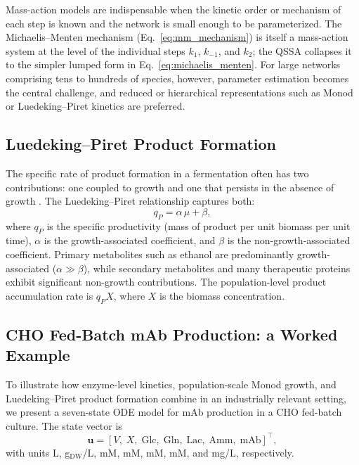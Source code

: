 Mass-action models are indispensable when the kinetic order or mechanism of
each step is known and the network is small enough to be parameterized.  The
Michaelis--Menten mechanism (Eq.~\ref{eq:mm_mechanism}) is itself a mass-action
system at the level of the individual steps $k_1$, $k_{-1}$, and $k_2$; the
QSSA collapses it to the simpler lumped form in Eq.~\eqref{eq:michaelis_menten}.
For large networks comprising tens to hundreds of species, however, parameter
estimation becomes the central challenge, and reduced or hierarchical
representations such as Monod or Luedeking--Piret kinetics are preferred.

\subsection{Luedeking--Piret Product Formation}

The specific rate of product formation in a fermentation often has two
contributions: one coupled to growth and one that persists in the absence of
growth \cite{LuedekingPiret1959}.  The Luedeking--Piret relationship captures
both:
\begin{equation}\label{eq:luedeking_piret}
  q_P = \alpha\,\mu + \beta,
\end{equation}
where $q_P$ is the specific productivity (mass of product per unit biomass per
unit time), $\alpha$ is the growth-associated coefficient, and $\beta$ is the
non-growth-associated coefficient.  Primary metabolites such as ethanol are
predominantly growth-associated ($\alpha \gg \beta$), while secondary
metabolites and many therapeutic proteins exhibit significant non-growth
contributions.  The population-level product accumulation rate is $q_P X$,
where $X$ is the biomass concentration.

\subsection{CHO Fed-Batch mAb Production: a Worked Example}

To illustrate how enzyme-level kinetics, population-scale Monod growth, and
Luedeking--Piret product formation combine in an industrially relevant setting,
we present a seven-state ODE model for mAb production in a CHO fed-batch
culture.  The state vector is
\begin{equation}\label{eq:cho_states}
  \mathbf{u} = [V,\; X,\; \text{Glc},\; \text{Gln},\; \text{Lac},\;
                \text{Amm},\; \text{mAb}]^{\top},
\end{equation}
with units L, g$_{\text{DW}}$/L, mM, mM, mM, mM, and mg/L, respectively.

